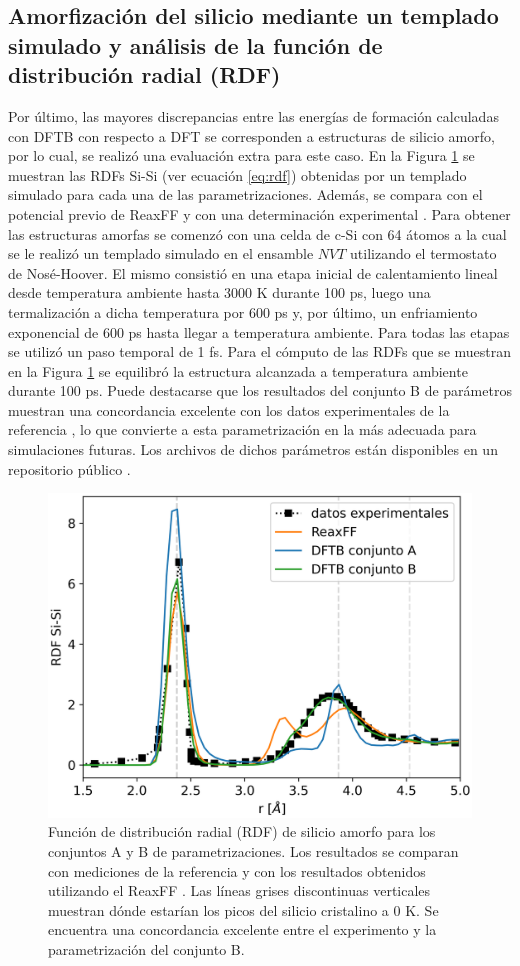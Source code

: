 \subsection{Amorfización del silicio mediante un templado simulado y análisis de la función de distribución radial (RDF)}\label{s:rdfb}

Por último, las mayores discrepancias entre las energías de formación calculadas con DFTB
con respecto a DFT se corresponden a estructuras de silicio amorfo, por lo cual,
se realizó una evaluación extra para este caso. En la Figura \ref{fig:rdfb} se 
muestran las RDFs Si-Si (ver ecuación \ref{eq:rdf}) obtenidas por un templado simulado para cada una de las
parametrizaciones. Además, se compara con el potencial previo de ReaxFF 
\cite{fan2013} y con una determinación experimental \cite{laaziri1999}. Para 
obtener las estructuras amorfas se comenzó con una celda de c-Si con 64 átomos 
a la cual se le realizó un templado simulado en el ensamble $NVT$ utilizando el 
termostato de Nosé-Hoover. El mismo consistió en una etapa inicial de 
calentamiento lineal desde temperatura ambiente hasta 3000 K durante 100 ps, luego una
termalización a dicha temperatura por 600 ps y, por último, un enfriamiento 
exponencial de 600 ps hasta llegar a temperatura ambiente. Para todas las etapas
se utilizó un paso temporal de 1 fs. Para el cómputo de las RDFs que se muestran
en la Figura \ref{fig:rdfb} se equilibró la estructura alcanzada a temperatura 
ambiente durante 100 ps. Puede destacarse que los resultados del conjunto B de parámetros muestran
una concordancia excelente con los datos experimentales de la referencia 
\cite{laaziri1999}, lo que convierte a esta parametrización en la más adecuada
para simulaciones futuras. Los archivos de dichos parámetros están disponibles
en un repositorio público \cite{dftb_lisi}.
\begin{figure}[h!]
    \centering
    \includegraphics[width=.7\textwidth]{Silicio/modelo/resultados/rdf/rdf.png}
    \caption{Función de distribución radial (RDF) de silicio amorfo para los
    conjuntos A y B de parametrizaciones. Los resultados se comparan con 
    mediciones de la referencia \cite{laaziri1999} y con los resultados obtenidos
    utilizando el ReaxFF \cite{fan2013}. Las líneas grises discontinuas verticales
    muestran dónde estarían los picos del silicio cristalino a 0 K. Se encuentra 
    una concordancia excelente entre el experimento y la parametrización del 
    conjunto B.}
    \label{fig:rdfb}
\end{figure}
